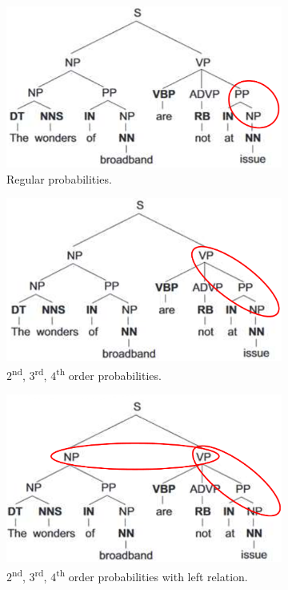 \begin{figure}[!ht]
    \centering
    \captionsetup{width=.8\linewidth}
    \begin{subfigure}{.32\textwidth}
        \centering
        \captionsetup{width=.8\linewidth}
        \includegraphics[width=.9\linewidth]{images/psg_1.png}
        \caption*{Regular probabilities.}
    \end{subfigure}
    \begin{subfigure}{.32\textwidth}
        \centering
        \captionsetup{width=.8\linewidth}
        \includegraphics[width=.9\linewidth]{images/psg_2.png}
        \caption*{$2$\textsuperscript{nd}, $3$\textsuperscript{rd}, $4$\textsuperscript{th} order probabilities.}
    \end{subfigure}
    \begin{subfigure}{.32\textwidth}
        \centering
        \captionsetup{width=.8\linewidth}
        \includegraphics[width=.9\linewidth]{images/psg_3.png}
        \caption*{$2$\textsuperscript{nd}, $3$\textsuperscript{rd}, $4$\textsuperscript{th} order probabilities with left relation.}
    \end{subfigure}
    \caption{}
    \label{fig:psg}
\end{figure}

